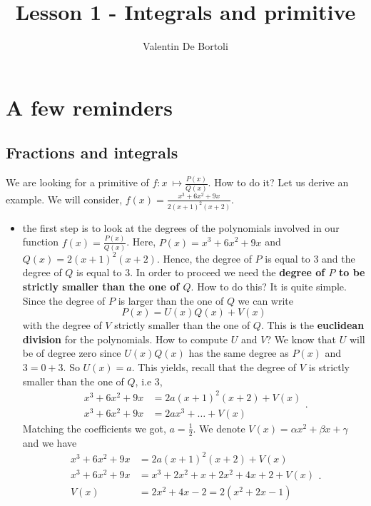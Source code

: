 \documentclass[10pt,a4paper]{article}
\title{Lesson 1 - Integrals and primitive}
\author{Valentin De Bortoli}
\begin{document}
\maketitle
\section{A few reminders}
\subsection{Fractions and integrals}
We are looking for a primitive of $f: x \ \mapsto \frac{P(x)}{Q(x)}$. How to do it? Let us derive an example. We will consider, $f(x) = \frac{x^3 + 6x^2 +9x}{2(x+1)^2(x+2)}$.
\begin{itemize}
\item the first step is to look at the degrees of the polynomials involved in our function $f(x) = \frac{P(x)}{Q(x)}$. Here, $P(x) = x^3+6x^2+9x$ and $Q(x) = 2(x+1)^2(x+2)$. Hence, the degree of $P$ is equal to $3$ and the degree of $Q$ is equal to $3$. In order to proceed we need the \textbf{degree of $P$ to be strictly smaller than the one of $Q$}. How to do this? It is quite simple. Since the degree of $P$ is larger than the one of $Q$ we can write
\begin{equation}
P(x) = U(x) Q(x) + V(x)
\end{equation}
with the degree of $V$ strictly smaller than the one of $Q$. This is the \textbf{euclidean division} for the polynomials. How to compute $U$ and $V$? We know that $U$ will be of degree zero since $U(x)Q(x)$ has the same degree as $P(x)$ and $3 = 0 +3$. So $U(x) = a$. This yields, recall that the degree of $V$ is strictly smaller than the one of $Q$, i.e 3, 
\begin{equation}
\begin{aligned}
x^3+6x^2+9x &= 2a(x+1)^2(x+2) + V(x) \\
x^3+6x^2+9x&= 2ax^3 + \dots + V(x)
\end{aligned}.
\end{equation}
Matching the coefficients we got, $a = \frac{1}{2}$. We denote $V(x) = \alpha x^2 + \beta x + \gamma$ and we have
\begin{equation}
\begin{aligned}
x^3+6x^2+9x &= 2a(x+1)^2(x+2) + V(x) \\
x^3+6x^2+9x &= x^3 + 2x^2 +x +2x^2 + 4x +2 + V(x) \\ 
V(x) &= 2x^2+4x -2 = 2(x^2+2x-1)
\end{aligned}.

\end{equation}
\end{itemize}
\end{document}
